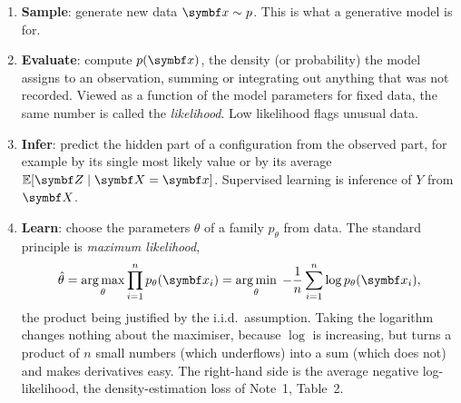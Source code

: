 \documentclass[11pt]{article}
\begin{document}
\begin{enumerate}
\item \textbf{Sample}: generate new data $\x \sim p$. This is what a generative model is for.
\item \textbf{Evaluate}: compute $p(\x)$, the density (or probability) the model assigns to an observation,
summing or integrating out anything that was not recorded. Viewed as a function of the model parameters for fixed
data, the same number is called the \emph{likelihood}. Low likelihood flags unusual data.
\item \textbf{Infer}: predict the hidden part of a configuration from the observed part, for example by its single
most likely value or by its average $\E[\vect{Z} \mid \X = \x]$. Supervised learning is inference of $Y$ from $\X$.
\item \textbf{Learn}: choose the parameters $\theta$ of a family $p_\theta$ from data. The standard principle is
\emph{maximum likelihood},
\begin{equation}\label{eq:mle}
  \hat\theta = \argmax_\theta \prod_{i=1}^n p_\theta(\x_i) = \argmin_\theta \; -\frac{1}{n}\sum_{i=1}^n \log p_\theta(\x_i),
\end{equation}
the product being justified by the i.i.d.\ assumption. Taking the logarithm changes nothing about the maximiser,
because $\log$ is increasing, but turns a product of $n$ small numbers (which underflows) into a sum (which does
not) and makes derivatives easy. The right-hand side is the average negative log-likelihood, the density-estimation
loss of Note~1, Table~2.
\end{enumerate}
\end{document}
